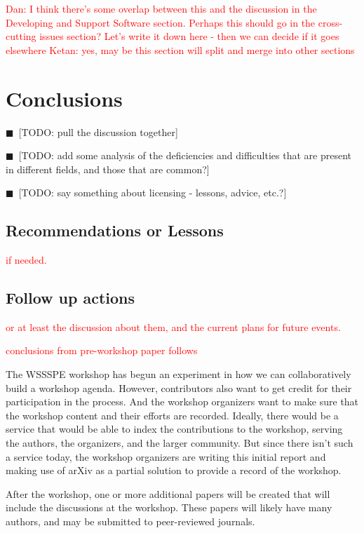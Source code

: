 \documentclass[11pt, oneside]{amsart}
\newcommand{\todo}[1]{{\color{blue}$\blacksquare$~\textsf{[TODO: #1]}}}
\newcommand{\note}[1]{ {\textcolor{red}    { #1 }}}
\begin{document}
\note{Dan: I think there's some overlap
  between this and the discussion in the Developing and Support
  Software section.  Perhaps this should go in the cross-cutting
  issues section?  Let's write it down here - then we can decide if it goes elsewhere}
\note{Ketan: yes, may be this section will split and merge into other sections}

\section{Conclusions} \label{sec:conclusions}

\todo{pull the discussion together}

\todo{add some analysis of the deficiencies and difficulties that are
  present in different fields, and those that are common?}

\todo{say something about licensing - lessons, advice, etc.?}

\subsection{Recommendations or Lessons}

\note{if needed.}

\subsection{Follow up actions}

\note{or at least the discussion about them, and the current plans for
  future events.}

\note{conclusions from pre-workshop paper follows}

The WSSSPE workshop has begun an experiment in how we can
collaboratively build a workshop agenda. However, contributors also
want to get credit for their participation in the process. And the
workshop organizers want to make sure that the workshop content and
their efforts are recorded.  Ideally, there would be a service that
would be able to index the contributions to the workshop, serving the
authors, the organizers, and the larger community. But since there
isn't such a service today, the workshop organizers are writing this
initial report and making use of arXiv as a partial solution to
provide a record of the workshop.

After the workshop, one or more additional papers will be created that
will include the discussions at the workshop. These papers will likely
have many authors, and may be submitted to peer-reviewed journals.
\end{document}
